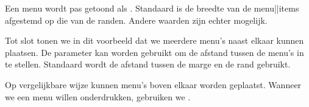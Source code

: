 Een menu wordt pas getoond als .
Standaard is de breedte van de menu||items afgestemd op die
van de randen. Andere waarden zijn echter mogelijk. 

\typebuffer[voorb-4]

\haalbuffer[voorb-6]

Tot slot tonen we in dit voorbeeld dat we meerdere menu's
naast elkaar kunnen plaatsen. De parameter 
kan worden gebruikt om de afstand tussen de menu's in te
stellen. Standaard wordt de afstand tussen de marge en de
rand gebruikt. 

\typebuffer[voorb-6]

Op vergelijkbare wijze kunnen menu's boven elkaar worden
geplaatst. Wanneer we een menu willen onderdrukken,
gebruiken we . 

\stoptekst
